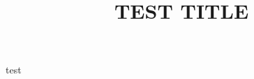 \documentclass{ecsdocs/ecsgdp}
\title{TEST TITLE}
\begin{document}
	\maketitle
	test
	
\end{document}
